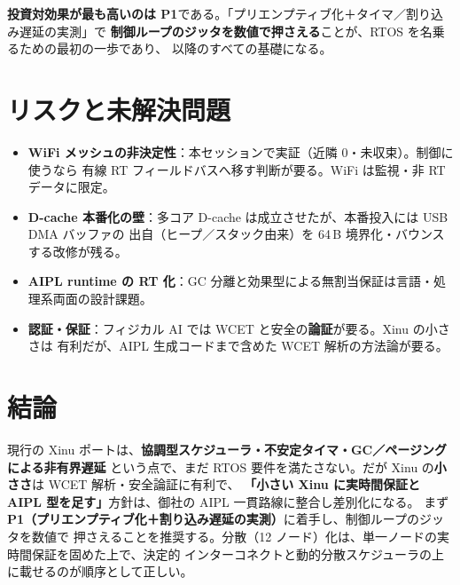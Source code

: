 \documentclass[11pt,a4paper]{article}
\begin{document}
\noindent
\textbf{投資対効果が最も高いのは P1}である。「プリエンプティブ化＋タイマ／割り込み遅延の実測」で
\textbf{制御ループのジッタを数値で押さえる}ことが、RTOS を名乗るための最初の一歩であり、
以降のすべての基礎になる。

\section{リスクと未解決問題}

\begin{itemize}[leftmargin=1.4em]
  \item \textbf{WiFi メッシュの非決定性}：本セッションで実証（近隣 0・未収束）。制御に使うなら
    有線 RT フィールドバスへ移す判断が要る。WiFi は監視・非 RT データに限定。
  \item \textbf{D-cache 本番化の壁}：多コア D-cache は成立させたが、本番投入には USB DMA バッファの
    出自（ヒープ／スタック由来）を 64\,B 境界化・バウンスする改修が残る。
  \item \textbf{AIPL runtime の RT 化}：GC 分離と効果型による無割当保証は言語・処理系両面の設計課題。
  \item \textbf{認証・保証}：フィジカル AI では WCET と安全の\textbf{論証}が要る。Xinu の小ささは
    有利だが、AIPL 生成コードまで含めた WCET 解析の方法論が要る。
\end{itemize}

\section{結論}

現行の Xinu ポートは、\textbf{協調型スケジューラ・不安定タイマ・GC／ページングによる非有界遅延}
という点で、まだ RTOS 要件を満たさない。だが Xinu の\textbf{小ささ}は WCET 解析・安全論証に有利で、
\textbf{「小さい Xinu に実時間保証と AIPL 型を足す」}方針は、御社の AIPL 一貫路線に整合し差別化になる。
まず\textbf{P1（プリエンプティブ化＋割り込み遅延の実測）}に着手し、制御ループのジッタを数値で
押さえることを推奨する。分散（12 ノード）化は、単一ノードの実時間保証を固めた上で、決定的
インターコネクトと動的分散スケジューラの上に載せるのが順序として正しい。
\end{document}
